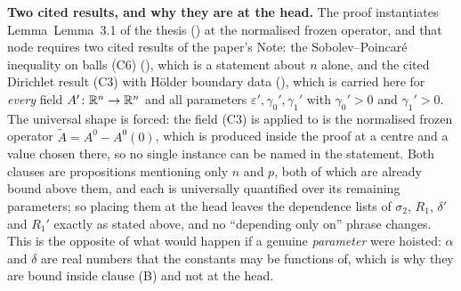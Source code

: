\begin{lemma}
\medskip
\noindent\textbf{Two cited results, and why they are at the head.}  The proof
instantiates Lemma~Lemma~3.1 of the thesis () at the
normalised frozen operator, and that node requires two cited results of the
paper's Note: the Sobolev--Poincar\'e inequality on balls (C6)
(), which is a statement about $n$ alone, and
the cited Dirichlet result (C3) with H\"older boundary data
(), which is carried here for \emph{every} field
$A'\colon\mathbb{R}^n\to\mathbb{R}^n$ and all parameters $\varepsilon',\gamma_0',\gamma_1'$ with
$\gamma_0'>0$ and $\gamma_1'>0$.  The universal shape is forced: the field (C3)
is applied to is the normalised frozen operator $\widetilde A=A^0-A^0(0)$, which
is produced inside the proof at a centre and a value chosen there, so no single
instance can be named in the statement.  Both clauses are propositions
mentioning only $n$ and $p$, both of which are already bound above them, and
each is universally quantified over its remaining parameters; so placing them at
the head leaves the dependence lists of $\sigma_2$, $R_1$, $\delta'$ and $R_1'$
exactly as stated above, and no ``depending only on'' phrase changes.  This is
the opposite of what would happen if a genuine \emph{parameter} were hoisted:
$\alpha$ and $\delta$ are real numbers that the constants may be functions of,
which is why they are bound inside clause (B) and not at the head.
\end{lemma}
